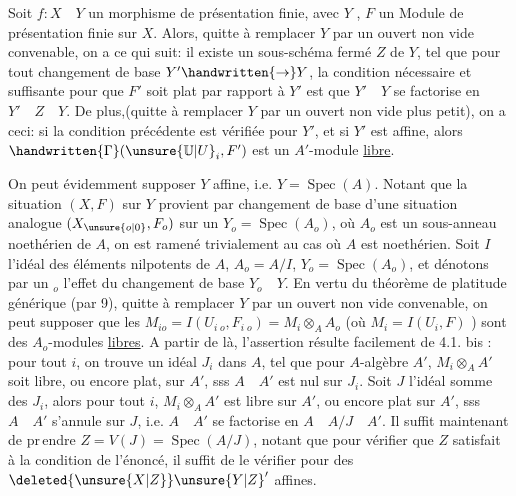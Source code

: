   Soit $f:X\quad Y$ un morphisme de présentation finie, avec $Y$ \inserted{\handwritten{$\ne\varnothing$}}, $F$ un Module de présentation finie sur $X$. Alors, quitte à remplacer $Y$ par un ouvert non vide convenable, on a ce qui suit: il existe un sous-schéma fermé  $Z$ de $Y$,  tel que pour tout changement de base $Y'\handwritten{\to}Y$, la condition nécessaire et suffisante pour que $F'$ soit plat par rapport à $Y'$ est que $Y'\quad Y$ se factorise  en $Y'\quad Z\quad Y$.
De plus,(quitte à remplacer $Y$ par un ouvert non vide plus petit), on a ceci: si la condition précédente est vérifiée pour $Y'$, et si $Y'$ est affine, alors  $\handwritten{\Gamma}(\unsure{\mathbb{U}|U}_i,F')$ est un $A'$-module \uline{libre}.

On peut évidemment supposer $Y$ affine, i.e. $Y=\operatorname{Spec}(A)$. Notant que la situation $(X,F)$ sur $Y$ provient par changement de base d'une situation analogue $(X_{\unsure{o|0}},F_o)$ sur un $Y_o=\operatorname{Spec}(A_o)$, où $A_o$ est un sous-anneau noethérien de $A$, on est ramené trivialement au cas où $A$ est noethérien. Soit $I$ l'idéal des éléments nilpotents de $A$, $A_o=A/I$, $Y_o=\operatorname{Spec}(A_o)$, et dénotons par un $ {}_o$ l'effet du changement de base $Y_o\quad Y$. En vertu du théorème de platitude générique (par 9), quitte à remplacer $Y$ par un ouvert non vide convenable, on peut supposer que les $M_{io}=I(U_{i\;o},F_{i\;o})=M_i\otimes_A A_o$ (où $M_i=I(U_i,F)$ ) sont des $A_o$-modules \uline{libres}. A partir de là, l'assertion résulte facilement de 4.1. bis : pour tout $i$, on trouve un idéal $J_i$ dans $A$, tel que pour  $A$-algèbre $A'$, $M_i\otimes_A A'$ soit libre, ou encore plat, sur $A'$, sss $A\quad A'$ est nul sur $J_i$. Soit $J$ l'idéal somme des $J_i$, alors pour tout $i$, $M_i\otimes_A A'$ est libre sur $A'$, ou encore plat sur $A'$, sss $A\quad A'$ s'annule sur $J$, i.e. $A\quad A'$ se factorise en $A\quad A/J\quad A'$. Il suffit maintenant de pr\,endre $Z=V(J)=\operatorname{Spec}(A/J)$, notant que  pour vérifier que $Z$ satisfait à la condition de l'énoncé, il suffit de le vérifier pour des $\deleted{\unsure{X|Z}}\unsure{Y|Z}'$ affines. 

